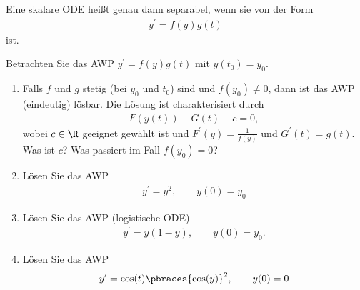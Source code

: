 \begin{definition}
    Eine skalare ODE heißt genau dann separabel, wenn sie von der Form
    \begin{align*}
        y^\prime = f(y)g(t) 
    \end{align*}
    ist.
\end{definition}

\begin{exercise}
    Betrachten Sie das AWP $y^\prime = f(y)g(t)$ mit $y(t_0) = y_0$. 
    \begin{enumerate}[label = \alph*)]
        \item Falls $f$ und $g$ stetig (bei $y_0$ und $t_0$) sind und $f(y_0) \neq 0$, dann ist das AWP (eindeutig) lösbar. Die Lösung ist charakterisiert durch
        \begin{align}
            F(y(t)) - G(t) + c = 0, \label{charakter}
        \end{align}
        wobei $c \in \R$ geeignet gewählt ist und $F^\prime(y) = \frac{1}{f(y)}$ und $G^\prime(t) = g(t)$. Was ist $c$? Was passiert im Fall $f(y_0) = 0$?
        \item Lösen Sie das AWP 
        \begin{align*}
            y^\prime = y^2, \qquad y(0) = y_0
        \end{align*}
        \item Lösen Sie das AWP (logistische ODE)
        \begin{align*}
            y^\prime = y(1 - y), \qquad y(0) = y_0.
        \end{align*}
        \item Lösen Sie das AWP
        \begin{align*}
            y^\prime = \cos(t) \pbraces{\cos(y)}^2, \qquad y(0) = 0
        \end{align*}
    \end{enumerate}
\end{exercise}
